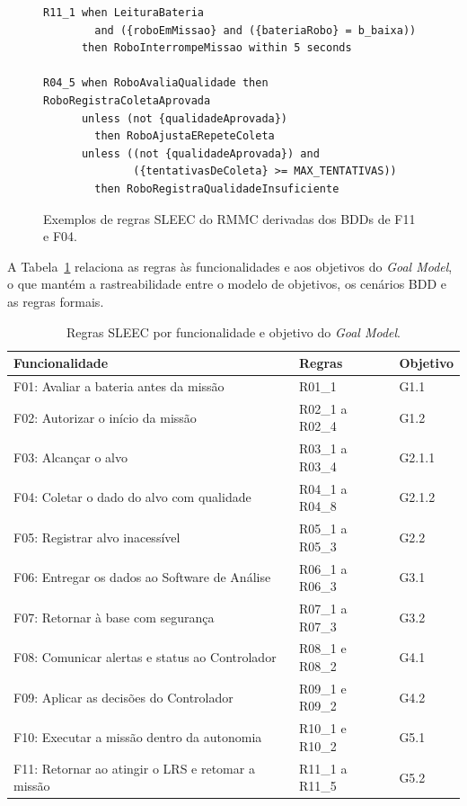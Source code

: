 \documentclass[a4paper, 12pt]{article}
\begin{document}
\begin{figure}[H]
  \centering
  \footnotesize
  \begin{verbatim}
R11_1 when LeituraBateria
        and ({roboEmMissao} and ({bateriaRobo} = b_baixa))
      then RoboInterrompeMissao within 5 seconds

R04_5 when RoboAvaliaQualidade then RoboRegistraColetaAprovada
      unless (not {qualidadeAprovada})
        then RoboAjustaERepeteColeta
      unless ((not {qualidadeAprovada}) and
              ({tentativasDeColeta} >= MAX_TENTATIVAS))
        then RoboRegistraQualidadeInsuficiente
\end{verbatim}
  \normalsize
  \caption{Exemplos de regras SLEEC do RMMC derivadas dos BDDs de F11 e F04.}
  \label{fig:sleecregras}
\end{figure}

A Tabela~\ref{tab:sleecregras} relaciona as regras às funcionalidades e aos objetivos do \textit{Goal Model}, o que mantém a rastreabilidade entre o modelo de objetivos, os cenários BDD e as regras formais.

\begin{table}[H]
  \centering
  \caption{Regras SLEEC por funcionalidade e objetivo do \textit{Goal Model}.}
  \label{tab:sleecregras}
  \begin{tabular}{|p{7.4cm}|p{2.9cm}|l|}
    \hline
    \textbf{Funcionalidade}                           & \textbf{Regras} & \textbf{Objetivo} \\ \hline
    F01: Avaliar a bateria antes da missão            & R01\_1          & G1.1              \\ \hline
    F02: Autorizar o início da missão                 & R02\_1 a R02\_4 & G1.2              \\ \hline
    F03: Alcançar o alvo                              & R03\_1 a R03\_4 & G2.1.1            \\ \hline
    F04: Coletar o dado do alvo com qualidade         & R04\_1 a R04\_8 & G2.1.2            \\ \hline
    F05: Registrar alvo inacessível                   & R05\_1 a R05\_3 & G2.2              \\ \hline
    F06: Entregar os dados ao Software de Análise     & R06\_1 a R06\_3 & G3.1              \\ \hline
    F07: Retornar à base com segurança                & R07\_1 a R07\_3 & G3.2              \\ \hline
    F08: Comunicar alertas e status ao Controlador    & R08\_1 e R08\_2 & G4.1              \\ \hline
    F09: Aplicar as decisões do Controlador           & R09\_1 e R09\_2 & G4.2              \\ \hline
    F10: Executar a missão dentro da autonomia        & R10\_1 e R10\_2 & G5.1              \\ \hline
    F11: Retornar ao atingir o LRS e retomar a missão & R11\_1 a R11\_5 & G5.2              \\ \hline
  \end{tabular}
\end{table}
\end{document}
